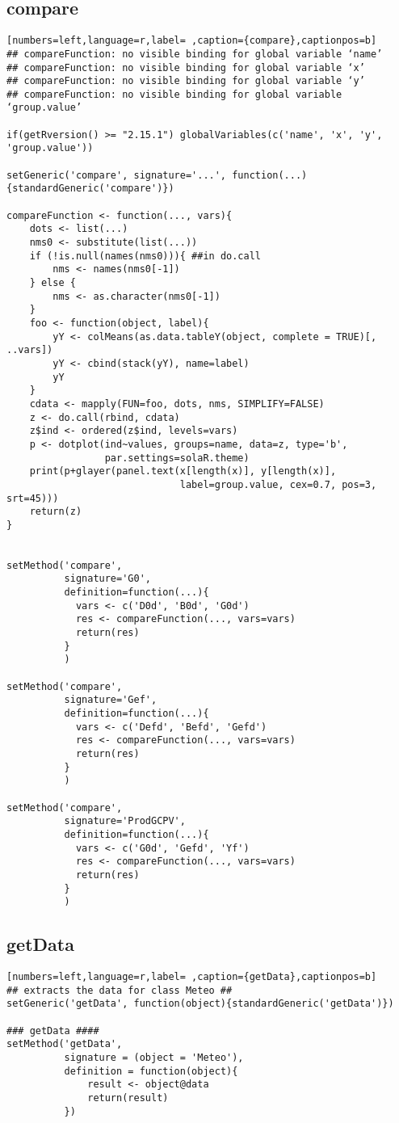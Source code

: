\subsection{compare}
\label{sec:org561f9ca}
\begin{lstlisting}[numbers=left,language=r,label= ,caption={compare},captionpos=b]
## compareFunction: no visible binding for global variable ‘name’
## compareFunction: no visible binding for global variable ‘x’
## compareFunction: no visible binding for global variable ‘y’
## compareFunction: no visible binding for global variable ‘group.value’

if(getRversion() >= "2.15.1") globalVariables(c('name', 'x', 'y', 'group.value'))

setGeneric('compare', signature='...', function(...){standardGeneric('compare')})

compareFunction <- function(..., vars){
    dots <- list(...)
    nms0 <- substitute(list(...))
    if (!is.null(names(nms0))){ ##in do.call
        nms <- names(nms0[-1])
    } else {
        nms <- as.character(nms0[-1])
    }
    foo <- function(object, label){
        yY <- colMeans(as.data.tableY(object, complete = TRUE)[, ..vars])
        yY <- cbind(stack(yY), name=label)
        yY
    }
    cdata <- mapply(FUN=foo, dots, nms, SIMPLIFY=FALSE)
    z <- do.call(rbind, cdata)
    z$ind <- ordered(z$ind, levels=vars)
    p <- dotplot(ind~values, groups=name, data=z, type='b',
                 par.settings=solaR.theme)
    print(p+glayer(panel.text(x[length(x)], y[length(x)],
                              label=group.value, cex=0.7, pos=3, srt=45)))
    return(z)
}


setMethod('compare',
          signature='G0',
          definition=function(...){
            vars <- c('D0d', 'B0d', 'G0d')
            res <- compareFunction(..., vars=vars)
            return(res)
          }
          )

setMethod('compare',
          signature='Gef',
          definition=function(...){
            vars <- c('Defd', 'Befd', 'Gefd')
            res <- compareFunction(..., vars=vars)
            return(res)
          }
          )

setMethod('compare',
          signature='ProdGCPV',
          definition=function(...){
            vars <- c('G0d', 'Gefd', 'Yf')
            res <- compareFunction(..., vars=vars)
            return(res)
          }
          )
\end{lstlisting}
\subsection{getData}
\label{sec:orgaec0fbc}
\begin{lstlisting}[numbers=left,language=r,label= ,caption={getData},captionpos=b]
## extracts the data for class Meteo ##
setGeneric('getData', function(object){standardGeneric('getData')})

### getData ####
setMethod('getData',
          signature = (object = 'Meteo'),
          definition = function(object){
              result <- object@data
              return(result)
          })
\end{lstlisting}
